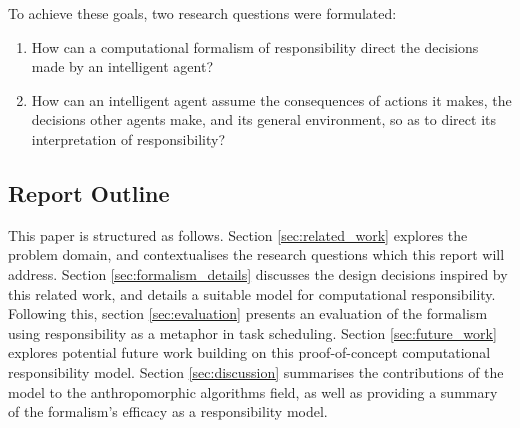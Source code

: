 To achieve these goals, two research questions were formulated:

\begin{enumerate}\label{RQ}
    \item How can a computational formalism of responsibility direct the decisions made by an intelligent agent?
    \item How can an intelligent agent assume the consequences of actions it makes, the decisions other agents make, and its general environment, so as to direct its interpretation of responsibility?
\end{enumerate}\par

\subsection{Report Outline}

This paper is structured as follows. Section \ref{sec:related_work} explores the problem domain, and contextualises the research questions which this report will address. Section \ref{sec:formalism_details} discusses the design decisions inspired by this related work, and details a suitable model for computational responsibility. Following this, section \ref{sec:evaluation} presents an evaluation of the formalism using responsibility as a metaphor in task scheduling.  Section \ref{sec:future_work} explores potential future work building on this proof-of-concept computational responsibility model. Section \ref{sec:discussion} summarises the contributions of the model to the anthropomorphic algorithms field, as well as providing a summary of the formalism's efficacy as a responsibility model.\par
% 
% 
% 
% 

